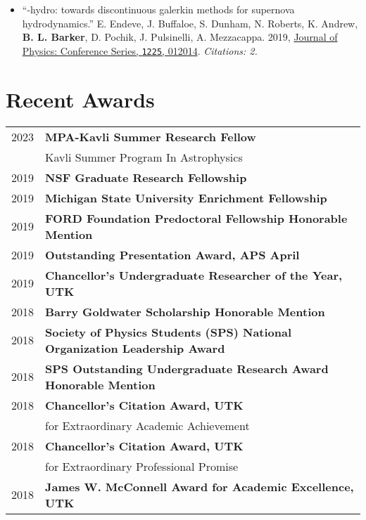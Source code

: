 \documentclass[letterpaper]{deedy-resume} %
\begin{document}
\begin{minipage}[t]{0.63\textwidth}
\begin{itemize}
        \item ``\thornado-hydro: towards discontinuous galerkin methods for supernova hydrodynamics.'' E. Endeve, J. Buffaloe, S. Dunham, N. Roberts, K. Andrew, \textbf{B. L. Barker}, D. Pochik, J. Pulsinelli, A. Mezzacappa. 2019, \href{https://doi.org/10.1088/1742-6596/1225/1/012014}{Journal of Physics: Conference Series, \texttt{1225}, 012014}. \emph{Citations: 2.}
   

\end{itemize}

\section{Recent Awards}
\begin{tabular}{rl}
  2023 & \textbf{MPA-Kavli Summer Research Fellow} \\
    & Kavli Summer Program In Astrophysics \\
  2019 & \textbf{NSF Graduate Research Fellowship} \\
  2019 & \textbf{Michigan State University Enrichment Fellowship} \\
  2019 & \textbf{FORD Foundation Predoctoral Fellowship Honorable Mention} \\
  2019 & \textbf{Outstanding Presentation Award, APS April} \\
  2019 & \textbf{Chancellor's Undergraduate Researcher of the Year, UTK} \\
  2018 & \textbf{Barry Goldwater Scholarship Honorable Mention} \\
  2018 & \textbf{Society of Physics Students (SPS) National Organization Leadership Award} \\
  2018 & \textbf{SPS Outstanding Undergraduate Research Award Honorable Mention}\\
  2018 & \textbf{Chancellor’s Citation Award, UTK}\\ & for Extraordinary Academic Achievement \\
  2018 & \textbf{Chancellor’s Citation Award, UTK}\\ &  for Extraordinary Professional Promise \\
  2018 & \textbf{James W. McConnell Award for Academic Excellence, UTK} \\

\end{tabular}
\end{minipage}
\end{document}
